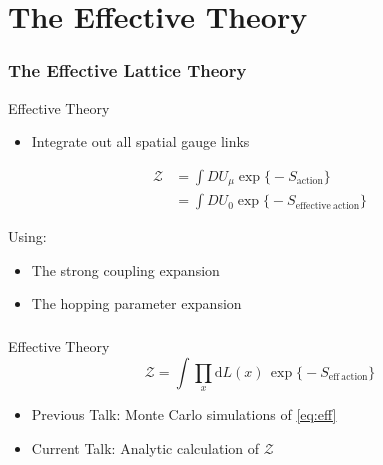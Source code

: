 \documentclass[12pt,a4paper,dvipsnames,usenames,handout]{beamer}
\begin{document}
\section{The Effective Theory}

\sectionframe

\begin{frame}
  \frametitle{The Effective Lattice Theory}

  \begin{alertblock}{Effective Theory}
    \begin{itemize}
      \item \color{LightUIBase} Integrate out all spatial gauge links
    \end{itemize}
    \begin{align*}
      \mathcal{Z} &= \int D U_{\mu} \exp\big\{ \minus S_{\mathrm{action}} \big\} \\
      &= \int D U_0 \exp\big\{ \minus S_{\mathrm{effective \: action}} \big\}
    \end{align*}
  \end{alertblock}

  \vspace{1em}

  {\color{LightUIRed}Using:}
  \begin{itemize}
    \item The strong coupling expansion
    \item The hopping parameter expansion
  \end{itemize}

\end{frame}

\begin{frame}
  \frametitle{}

  \begin{block}{Effective Theory}
    \begin{equation} \tag{$\dagger$} \label{eq:eff}
      \mathcal{Z} = \int \prod_x \mathrm{d} L(x) \, \exp \big\{ \minus S_{\mathrm{eff \: action}} \big\}
    \end{equation}
  \end{block}

  \vspace{1em}

  \begin{itemize} \setlength\itemsep{2em}
    \item Previous Talk: Monte Carlo simulations of \eqref{eq:eff}
    \item Current Talk: Analytic calculation of $\mathcal{Z}$
  \end{itemize}

\end{frame}
\end{document}
